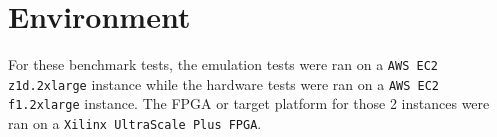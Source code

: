 \section{Environment}

For these benchmark tests, the emulation tests were ran on a \texttt{AWS EC2 z1d.2xlarge} instance while the hardware tests were ran on a \texttt{AWS EC2 f1.2xlarge} instance. The FPGA or target platform for those 2 instances were ran on a \texttt{Xilinx UltraScale Plus FPGA}.